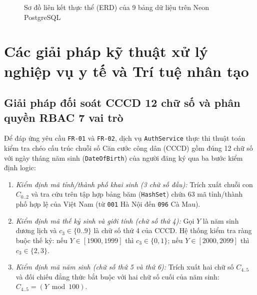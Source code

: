 \begin{figure}[H]
\caption{Sơ đồ liên kết thực thể (ERD) của 9 bảng dữ liệu trên Neon PostgreSQL}
\label{fig:erd_diagram}
\end{figure}

\section{Các giải pháp kỹ thuật xử lý nghiệp vụ y tế và Trí tuệ nhân tạo}

\subsection{Giải pháp đối soát CCCD 12 chữ số và phân quyền RBAC 7 vai trò}

Để đáp ứng yêu cầu \texttt{FR-01} và \texttt{FR-02}, dịch vụ \texttt{AuthService} thực thi thuật toán kiểm tra chéo cấu trúc chuỗi số Căn cước công dân (CCCD) gồm đúng 12 chữ số với ngày tháng năm sinh (\texttt{DateOfBirth}) của người đăng ký qua ba bước kiểm định logic:
\begin{enumerate}
    \item \textit{Kiểm định mã tỉnh/thành phố khai sinh (3 chữ số đầu):} Trích xuất chuỗi con $C_{0..2}$ và tra cứu trên tập hợp bảng băm (\texttt{HashSet}) chứa 63 mã tỉnh/thành phố hợp lệ của Việt Nam (từ \texttt{001} Hà Nội đến \texttt{096} Cà Mau).
    \item \textit{Kiểm định mã thế kỷ sinh và giới tính (chữ số thứ 4):} Gọi $Y$ là năm sinh dương lịch và $c_3 \in \{0..9\}$ là chữ số thứ 4 của CCCD. Hệ thống kiểm tra ràng buộc thế kỷ: nếu $Y \in [1900, 1999]$ thì $c_3 \in \{0, 1\}$; nếu $Y \in [2000, 2099]$ thì $c_3 \in \{2, 3\}$.
    \item \textit{Kiểm định mã năm sinh (chữ số thứ 5 và thứ 6):} Trích xuất hai chữ số $C_{4..5}$ và đối chiếu đẳng thức bắt buộc với hai chữ số cuối của năm sinh: $C_{4..5} = (Y \bmod 100)$.
\end{enumerate}

